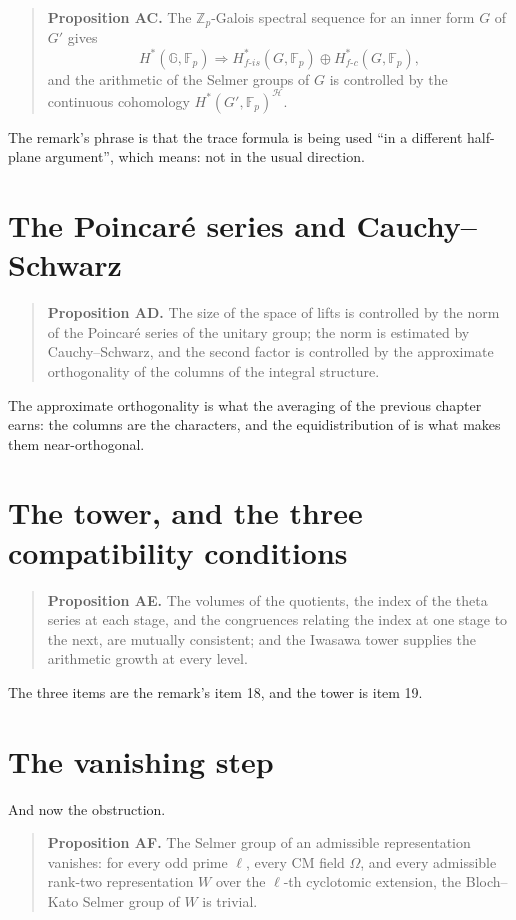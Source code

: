 \begin{quote}
\textbf{Proposition AC.} The $\mathbb{Z}_p$-Galois spectral sequence for an
inner form $G$ of $G'$ gives
\[
H^*(\mathbb{G},\mathbb{F}_p) \Longrightarrow
H^*_{f\text{-}is}(G,\mathbb{F}_p) \oplus H^*_{f\text{-}c}(G,\mathbb{F}_p),
\]
and the arithmetic of the Selmer groups of $G$ is controlled by the continuous
cohomology $H^*(G',\mathbb{F}_p)^{\mathcal{H}}$.
\end{quote}

The remark's phrase is that the trace formula is being used ``in a different
half-plane argument'', which means: not in the usual direction.

\section{The Poincar\'e series and Cauchy--Schwarz}\begin{quote}
\textbf{Proposition AD.} The size of the space of lifts is controlled by the
norm of the Poincar\'e series of the unitary group; the norm is estimated by
Cauchy--Schwarz, and the second factor is controlled by the approximate
orthogonality of the columns of the integral structure.
\end{quote}

The approximate orthogonality is what the averaging of the previous chapter
earns: the columns are the characters, and the equidistribution of
 is what makes them near-orthogonal.

\section{The tower, and the three compatibility conditions}\begin{quote}
\textbf{Proposition AE.} The volumes of the quotients, the index of the theta
series at each stage, and the congruences relating the index at one stage to
the next, are mutually consistent; and the Iwasawa tower supplies the
arithmetic growth at every level.
\end{quote}

The three items are the remark's item 18, and the tower is item 19.

\section{The vanishing step}And now the obstruction.

\begin{quote}
\textbf{Proposition AF.} The Selmer group of an admissible representation
vanishes: for every odd prime $\ell$, every CM field $\Omega$, and every
admissible rank-two representation $W$ over the $\ell$-th cyclotomic
extension, the Bloch--Kato Selmer group of $W$ is trivial.
\end{quote}

